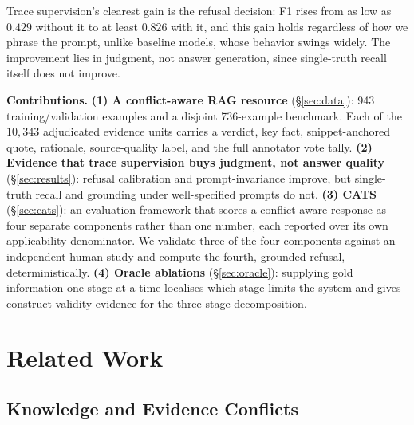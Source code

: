 \documentclass{article} %
\begin{document}
Trace supervision's clearest gain is the refusal decision: F1 rises from as
low as $0.429$ without it to at least $0.826$ with it, and this gain holds
regardless of how we phrase the prompt, unlike baseline models, whose
behavior swings widely. The improvement lies in judgment, not answer
generation, since single-truth recall itself does not improve.

\textbf{Contributions.} \textbf{(1) A conflict-aware RAG resource}
(\S\ref{sec:data}): 943 training/validation examples and a disjoint 736-example
benchmark. Each of the $10{,}343$ adjudicated evidence units carries a verdict,
key fact, snippet-anchored quote, rationale, source-quality label, and the full
annotator vote tally. \textbf{(2) Evidence that trace supervision buys judgment,
not answer quality} (\S\ref{sec:results}): refusal calibration and
prompt-invariance improve, but single-truth recall and grounding under
well-specified prompts do not. \textbf{(3) CATS} (\S\ref{sec:cats}): an
evaluation framework that scores a conflict-aware response as four separate
components rather than one number, each reported over its own applicability
denominator. We validate three of the four components against an independent
human study and compute the fourth, grounded refusal, deterministically.
\textbf{(4) Oracle
ablations} (\S\ref{sec:oracle}): supplying gold information one stage at a time
localises which stage limits the system and gives construct-validity evidence for
the three-stage decomposition.

\section{Related Work}
\label{sec:related}

\subsection{Knowledge and Evidence Conflicts}
\end{document}
